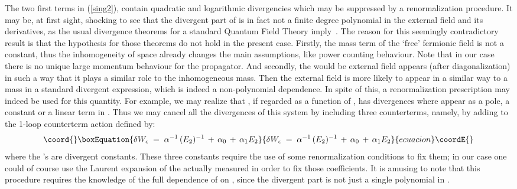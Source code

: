\documentclass[a4paper,12pt]{article}
\begin{document}
The two first terms in (\ref{sing2}), contain quadratic and
logarithmic divergencies which may be suppressed by a renormalization
procedure. It may be, at first sight, shocking to see that the
divergent part of \coordHE{} is in fact not a finite degree polynomial in
the external field \coordHE{} and its derivatives, as the usual
divergence theorems for a standard Quantum Field Theory
imply~\cite{itzykson}. The reason for this seemingly contradictory
result is that the hypothesis for those theorems do not hold in the
present case. Firstly, the mass term of the `free' fermionic field is
not a constant, thus the inhomogeneity of space already changes the
main assumptions, like power counting behaviour. Note that in our case
there is no unique large momentum behaviour for the propagator.  And
secondly, the would be external field \coordHE{} appears (after
diagonalization) in such a way that it plays a similar role to the
inhomogeneous mass. Then the external field is more likely to appear
in a similar way to a mass in a standard divergent expression, which
is indeed a non-polynomial dependence.
%
In spite of this, a renormalization prescription may indeed be used for this 
quantity. For example, we may realize that \coordHE{}, if regarded as a function of 
\coordHE{}, has divergences where \coordHE{} appear as a pole, a constant or a linear term
in \coordHE{}. Thus we may cancel all the divergences of this system by including
three counterterms, namely, by adding to \coordHE{} the 1-loop counterterm action
\coordHE{} defined by:
\begin{equation}\coord{}\boxEquation{
  \label{counter}
\delta W_\epsilon \;=\; \alpha^{-1} \, (E_2)^{-1} \,+\, \alpha_0 \,+\, \alpha_1 E_2  
}{
  \delta W_\epsilon \;=\; \alpha^{-1} \, (E_2)^{-1} \,+\, \alpha_0 \,+\, \alpha_1 E_2  
}{ecuacion}\coordE{}\end{equation}   
where the \coordHE{}'s are divergent constants. These three constants
require the use of some renormalization conditions to fix them; in our
case one could of course use the Laurent expansion of the actually
measured \coordHE{} in order to fix those coefficients. It is amusing to
note that this procedure requires the knowledge of the full dependence
of \coordHE{} on \coordHE{}, since the divergent part is not just a single
polynomial in \coordHE{}.
\end{document}
